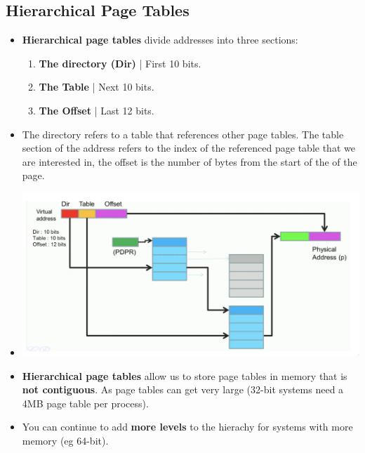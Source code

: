 \documentclass{article}
\begin{document}
    \subsection*{Hierarchical Page Tables}
    \begin{itemize}
        \item \textbf{Hierarchical page tables} divide addresses into three sections:
        \begin{enumerate}
            \item \textbf{The directory (Dir)} | First 10 bits.
            \item \textbf{The Table} | Next 10 bits.
            \item \textbf{The Offset} | Last 12 bits.
        \end{enumerate}
        \item The directory refers to a table that references other page tables. The table section of the address refers to the index of the referenced page table that we are interested in, the offset is the number of bytes from the start of the of the page.
        \item[] \includegraphics[width=\textwidth - 25pt]{images/Hierarchial-Page-Table.png}
        \item \textbf{Hierarchical page tables} allow us to store page tables in memory that is \textbf{not contiguous}. As page tables can get very large (32-bit systems need a 4MB page table per process). 
        \item You can continue to add \textbf{more levels} to the hierachy for systems with more memory (eg 64-bit).
    \end{itemize}
\end{document}
